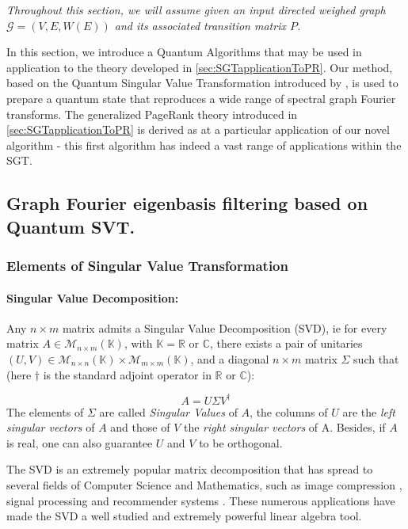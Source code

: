 \documentclass[sn-mathphys]{sn-jnl}%
\theoremstyle{thmstyleone}%
\theoremstyle{thmstyletwo}%
\theoremstyle{thmstylethree}%
\begin{document}
\textit{Throughout this section, we will assume given an input directed weighed graph $\mathcal{G}=(V,E,W(E))$ and its associated transition matrix $P$.}

In this section, we introduce a Quantum Algorithms that may be used in
application to the theory developed in \ref{sec:SGTapplicationToPR}.
Our method, based on the Quantum Singular Value Transformation
introduced by \cite{gilyen_su_low_wiebe_2019}, is used to prepare a
quantum state that reproduces a wide range of spectral graph Fourier
transforms. The generalized PageRank theory introduced in
\ref{sec:SGTapplicationToPR} is derived as at a particular application
of our novel algorithm - this first algorithm has indeed a vast range
of applications within the SGT.
    
\subsection{Graph Fourier eigenbasis filtering based on Quantum SVT.}

\subsubsection{Elements of Singular Value Transformation}
\paragraph{Singular Value Decomposition:}
Any $n\times m$ matrix admits a Singular Value Decomposition (SVD), ie
for every matrix $A \in \mathcal{M}_{n\times m}(\mathbb{K})$, with
$\mathbb{K} = \mathbb{R}$ or $\mathbb{C}$, there exists a pair of
unitaries
$(U,V)\in \mathcal{M}_{n\times n}(\mathbb{K}) \times
\mathcal{M}_{m\times m}(\mathbb{K})$, and a diagonal $n \times m$
matrix $\Sigma$ such that (here $\dagger$ is the standard adjoint
operator in $\mathbb{R}$ or $\mathbb{C}$):

\begin{equation}
    A = U \Sigma V^\dagger
\end{equation}
The elements of $\Sigma$ are called \textit{Singular Values} of $A$,
the columns of $U$ are the \textit{left singular vectors} of $A$ and
those of $V$ the \textit{right singular vectors} of A. Besides, if $A$
is real, one can also guarantee $U$ and $V$ to be orthogonal.

The SVD is an extremely popular matrix decomposition that has spread
to several fields of Computer Science and Mathematics, such as image
compression \cite{image_compression_svd}, signal processing
\cite{alter_brown_botstein_2000} and recommender systems
\cite{fang_guo_ding_lan_2014}. These numerous applications have made
the SVD a well studied and extremely powerful linear algebra tool.
\end{document}
